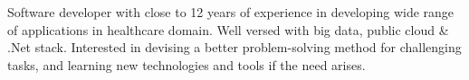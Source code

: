 \par{
Software developer with close to 12 years of experience in developing wide range of applications in healthcare domain. Well versed with big data, public cloud \& .Net stack. Interested in devising a better problem-solving method for challenging tasks, and learning new technologies and tools if the need arises.\\
}